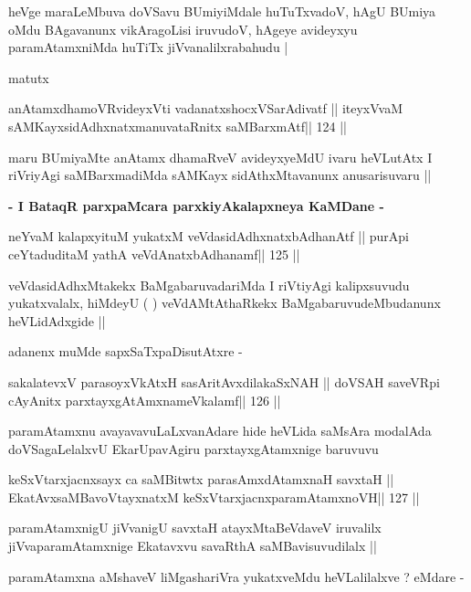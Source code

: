 \begin{artha}
heVge maraLeMbuva doVSavu BUmiyiMdale huTuTxvadoV, hAgU BUmiya oMdu
BAgavanunx vikAragoLisi iruvudoV, hAgeye avideyxyu paramAtamxniMda
huTiTx jiVvanalilxrabahudu |

matutx
\end{artha}

\begin{shl}
anAtamxdhamoVR\s videyxVti vadanatxshocxVSarAdivatf ||
iteyxVvaM sAMKayxsidAdhxnatxmanuvataRnitx saMBarxmAtf\hfill || 124 ||
\end{shl}

\begin{artha}
maru BUmiyaMte anAtamx dhamaRveV avideyxyeMdU ivaru heVLutAtx I
riVriyAgi saMBarxmadiMda sAMKayx sidAthxMtavanunx anusarisuvaru ||
\end{artha}

\begin{center}
\textbf{- I BataqR parxpaMcara parxkiyAkalapxneya KaMDane -}
\end{center}

\begin{shl}
neYvaM kalapxyituM yukatxM veVdasidAdhxnatxbAdhanAtf ||
purA\s pi ceYtaduditaM yathA veVdAnatxbAdhanamf\hfill || 125 ||
\end{shl}

\begin{artha}
veVdasidAdhxMtakekx BaMgabaruvadariMda I riVtiyAgi kalipxsuvudu
yukatxvalalx, hiMdeyU ( ) veVdAMtAthaRkekx BaMgabaruvudeMbudanunx
heVLidAdxgide ||

adanenx muMde sapxSaTxpaDisutAtxre -
\end{artha}

\begin{shl}
sakalatevxV parasoyxVkAtxH sasAritAvxdilakaSxNAH ||
doVSAH saveVR\s pi cA\s\s yAnitx parxtayxgAtAmxnameVkalamf\hfill || 126 ||
\end{shl}

\begin{artha}
paramAtamxnu avayavavuLaLxvanAdare hide heVLida saMsAra modalAda
doVSagaLelalxvU EkarUpavAgiru parxtayxgAtamxnige baruvuvu
\end{artha}

\begin{shl}
keSxVtarxjacnxsayx ca saMBitwtx parasAmxdAtamxnaH savxtaH ||
EkatAvxsaMBavoV\s tayxnatxM keSxVtarxjacnxparamAtamxnoVH\hfill || 127 ||
\end{shl}

\begin{artha}
paramAtamxnigU jiVvanigU savxtaH atayxMtaBeVdaveV iruvalilx
jiVvaparamAtamxnige Ekatavxvu savaRthA saMBavisuvudilalx ||

paramAtamxna aMshaveV liMgashariVra yukatxveMdu heVLalilalxve ? eMdare -
\end{artha}

